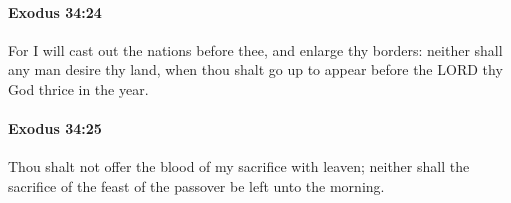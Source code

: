 		\paragraph{Exodus 34:24} %
			\label{EXODUS-34-24}

			For I will cast out the nations before thee, and enlarge thy borders: neither shall any man desire thy land, when thou shalt go up to appear before the LORD thy God thrice in the year.


		\paragraph{Exodus 34:25} %
			\label{EXODUS-34-25}

			Thou shalt not offer the blood of my sacrifice with leaven; neither shall the sacrifice of the feast of the passover be left unto the morning.


